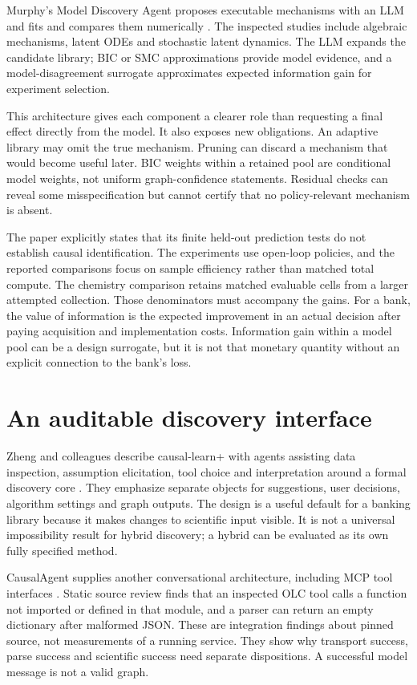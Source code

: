 Murphy's Model Discovery Agent proposes executable mechanisms with an LLM and
fits and compares them numerically \cite{v12_la_2608_09696}. The inspected
studies include algebraic mechanisms, latent ODEs and stochastic latent
dynamics. The LLM expands the candidate library; BIC or SMC approximations
provide model evidence, and a model-disagreement surrogate approximates
expected information gain for experiment selection.

This architecture gives each component a clearer role than requesting a final
effect directly from the model. It also exposes new obligations. An adaptive
library may omit the true mechanism. Pruning can discard a mechanism that
would become useful later. BIC weights within a retained pool are conditional
model weights, not uniform graph-confidence statements. Residual checks can
reveal some misspecification but cannot certify that no policy-relevant
mechanism is absent.

The paper explicitly states that its finite held-out prediction tests do not
establish causal identification. The experiments use open-loop policies, and
the reported comparisons focus on sample efficiency rather than matched total
compute. The chemistry comparison retains matched evaluable cells from a
larger attempted collection. Those denominators must accompany the gains.
For a bank, the value of information is the expected improvement in an actual
decision after paying acquisition and implementation costs. Information gain
within a model pool can be a design surrogate, but it is not that monetary
quantity without an explicit connection to the bank's loss.

\section{An auditable discovery interface}

Zheng and colleagues describe causal-learn+ with agents assisting data
inspection, assumption elicitation, tool choice and interpretation around a
formal discovery core \cite{v12_la_2606_23608}. They emphasize separate
objects for suggestions, user decisions, algorithm settings and graph outputs.
The design is a useful default for a banking library because it makes changes
to scientific input visible. It is not a universal impossibility result for
hybrid discovery; a hybrid can be evaluated as its own fully specified method.

CausalAgent supplies another conversational architecture, including MCP tool
interfaces \cite{v12_la_2602_11527}. Static source review finds that an
inspected OLC tool calls a function not imported or defined in that module,
and a parser can return an empty dictionary after malformed JSON. These are
integration findings about pinned source, not measurements of a running
service. They show why transport success, parse success and scientific success
need separate dispositions. A successful model message is not a valid graph.

